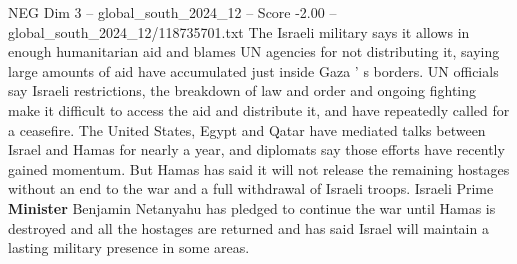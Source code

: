 \begin{textsample}{NEG Dim 3 – global\_south\_2024\_12 – Score -2.00 – global\_south\_2024\_12/118735701.txt}
The Israeli military says it allows in enough humanitarian aid and blames UN agencies for not distributing it, saying large amounts of aid have accumulated just inside Gaza ' s borders.
UN officials say Israeli restrictions, the breakdown of law and order and ongoing fighting make it difficult to access the aid and distribute it, and have repeatedly called for a ceasefire.
The United States, Egypt and Qatar have mediated talks between Israel and Hamas for nearly a year, and diplomats say those efforts have recently gained momentum.
But Hamas has said it will not release the remaining hostages without an end to the war and a full withdrawal of Israeli troops.
Israeli Prime \textbf{Minister} Benjamin Netanyahu has pledged to continue the war until Hamas is destroyed and all the hostages are returned and has said Israel will maintain a lasting military presence in some areas.

\end{textsample}
